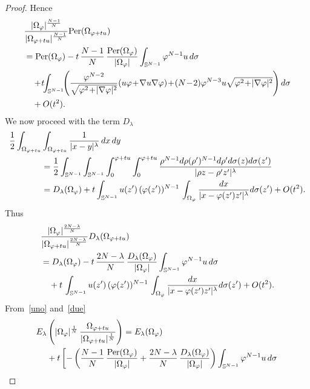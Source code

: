 \documentclass[10pt,a4paper]{amsart}
\newcommand{\be}{\begin{equation}}
\newcommand{\ee}{\end{equation}}
\begin{document}
\begin{proof}
Hence
\be\label{uno}
\begin{aligned}
     &{ |\Omega_\varphi |^{N-1 \over N} \over |\Omega_{\varphi+tu}|^{N-1\over N}}  {\mbox {Per}} (\Omega_{\varphi + t u}) \\
     &={\mbox {Per}} (\Omega_{\varphi })- t \,  {N-1 \over N} \, {{\mbox {Per}} (\Omega_{\varphi }) \over  |\Omega_\varphi |} \int_{\mathbb S^{N-1}} \varphi^{N-1} u \,d\sigma  \\
     &\quad+\!t\!\! \int_{\mathbb S^{N-1}} \!\! \left( {\varphi^{N-2} \over  \sqrt{ \varphi^2\! +\! |\nabla \varphi|^2}} (u \varphi\! +\! \nabla u \nabla \varphi)\! +\! (N\!-\!2) \varphi^{N-3} u  \sqrt{ \varphi^2 \!+\! |\nabla \varphi|^2}\right) d \sigma \\
    &\quad+ O(t^2) .
\end{aligned}
\ee
We now proceed with the term $D_\lambda$
\begin{align*}
   {1\over 2} \int_{\Omega_{\varphi +tu}}& \int_{\Omega_{\varphi +t u}} {1\over |x-y|^\lambda } \, dx \, dy\\
        &= {1\over 2}\int_{\mathbb S^{N-1}} \int_{\mathbb S^{N-1}} \int_0^{\varphi + t u}   \int_0^{\varphi + t u} {\rho^{N-1}  d \rho (\rho')^{N-1} d \rho' d \sigma(z) d \sigma(z')\over |\rho z - \rho' z'|^\lambda}\\
     &=D_\lambda(\Omega_\varphi)+ t \int_{\mathbb S^{N-1}}  u(z') \, (\varphi (z'))^{N-1} \,  \int_{\Omega_\varphi}    {  d x\over |x - \varphi (z')   z'|^\lambda} d \sigma (z') + O(t^2).
\end{align*}
Thus
\be\label{due}
\begin{aligned}
 &{ |\Omega_\varphi |^{2N-\lambda \over N} \over |\Omega_{\varphi+tu}|^{2N-\lambda\over N}}   D_\lambda(\Omega_{\varphi +tu}) \\
 &=D_\lambda(\Omega_\varphi)- t \,  {2N-\lambda \over N} \,\frac{D_\lambda(\Omega_\varphi) }{|\Omega_\varphi |}\int_{\mathbb S^{N-1}} \varphi^{N-1} u \,d\sigma  \\
     &\quad+t \, \int_{\mathbb S^{N-1}}  u(z') \, (\varphi (z'))^{N-1} \,  \int_{\Omega_\varphi}    {  d x\over |x - \varphi (z')   z'|^\lambda} d \sigma (z')+ O(t^2) .
\end{aligned}
\ee
From~\eqref{uno} and~\eqref{due}
\[
\begin{aligned}
  E_\lambda &\left( |\Omega_\varphi |^{1\over N} \, {\Omega_{\varphi +t u} \over |\Omega_{\varphi+tu}|^{1\over N}} \right) =E_\lambda(\Omega_\varphi)\\
  &+t\left[
 -\left( {N-1 \over N} \, {{\mbox {Per}} (\Omega_{\varphi }) \over  |\Omega_\varphi |} +{2N-\lambda \over N} \,\frac{D_\lambda(\Omega_\varphi) }{|\Omega_\varphi |}\right)\int_{\mathbb S^{N-1}} \varphi^{N-1} u\,d\sigma \right.\\

\end{aligned}\]
\end{proof}
\end{document}
